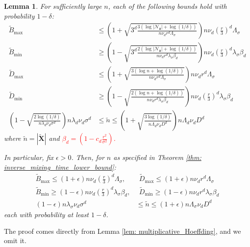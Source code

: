 \documentclass{article}
\newcommand{\abs}[1]{\left \lvert #1 \right \rvert}
\newcommand{\1}{\mathbf{1}}
\newcommand{\zbf}{\mathbf{z}}
\newcommand{\Xbf}{\mathbf{X}}
\newcommand{\wn}{\widetilde{n}}
\newcommand{\wX}{\widetilde{\Xbf}}
\theoremstyle{aldenthm}
\newtheorem{lemma}{Lemma}
\begin{document}
\begin{lemma}
	\label{lem: ball_bounds}
	For sufficiently large $n$, each of the following bounds hold with probability $1 - \delta$:
	\begin{align*}
	\widetilde{B}_{\max} & \leq \left(1 + \sqrt{3^d\frac{3(\log \abs{\mathcal{N}_{\zbf}} + \log(1/\delta))}{n \nu_d r^d \Lambda_{\sigma}}}\right) n \nu_d \left(\frac{r}{3}\right)^d \Lambda_{\sigma} \\
	\widetilde{B}_{\min} & \geq \left(1 - \sqrt{3^d\frac{2(\log \abs{\mathcal{N}_{\zbf}} + \log(1/\delta))}{n \nu_d r^d \lambda_{\sigma} \beta_d}}\right) n \nu_d \left(\frac{r}{3}\right)^d \lambda_{\sigma} \beta_d \\
	\widetilde{D}_{\max} & \leq \left(1 + \sqrt{\frac{3(\log n + \log(1/\delta))}{n \nu_d r^d \Lambda_{\sigma}}}\right) n \nu_d r^d \Lambda_{\sigma} \\
	\widetilde{D}_{\min} & \geq \left(1 - \sqrt{\frac{2(\log n + \log(1/\delta))}{n \nu_d r^d \lambda_{\sigma} \beta_d}}\right) n \nu_d \left(\frac{r}{3}\right)^d \lambda_{\sigma} \beta_d \\
	\left(1 - \sqrt{\frac{2 \log(1/\delta)}{n \lambda_d \nu_d \sigma^d}}\right) n \lambda_d \nu_d \sigma^d & \leq \widetilde{n} \leq \left(1 + \sqrt{\frac{3 \log(1/\delta)}{n \Lambda_d \nu_d D^d}}\right) n \Lambda_d \nu_d D^d
	\end{align*}
	where $\wn = \abs{\wX}$ and \textcolor{red}{$\beta_d = (1 - c_d\frac{r^2}{\sigma^2})$.}
	
	In particular, fix $\epsilon > 0$. Then, for $n$ as specified in Theorem \ref{thm: inverse_mixing_time_lower_bound}:
	\begin{align*}
	\widetilde{B}_{\max} \leq \left(1 + \epsilon \right) n \nu_d \left(\frac{r}{3}\right)^d \Lambda_{\sigma},& ~~ \widetilde{D}_{\max} \leq \left(1 + \epsilon \right) n \nu_d r^d \Lambda_{\sigma} \\
	\widetilde{B}_{\min} \geq \left(1 - \epsilon \right) n \nu_d \left(\frac{r}{3}\right)^d \lambda_{\sigma} \beta_{d},& ~~ \widetilde{D}_{\min} \geq \left(1 - \epsilon \right) n \nu_d r^d \lambda_{\sigma} \beta_{d} \\
	(1 - \epsilon) n \lambda_{\sigma} \nu_d \sigma^d & \leq \widetilde{n} \leq (1 + \epsilon) n \Lambda_{\sigma} \nu_d D^d 
	\end{align*}
	each with probability at least $1 - \delta$.
\end{lemma}
The proof comes directly from Lemma \ref{lem: multiplicative_Hoeffding}, and we omit it.
\end{document}
